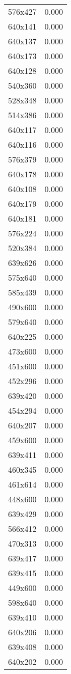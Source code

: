 \begin{table}
\begin{tabular}{lr}
576x427 & 0.000 \\
640x141 & 0.000 \\
640x137 & 0.000 \\
640x173 & 0.000 \\
640x128 & 0.000 \\
540x360 & 0.000 \\
528x348 & 0.000 \\
514x386 & 0.000 \\
640x117 & 0.000 \\
640x116 & 0.000 \\
576x379 & 0.000 \\
640x178 & 0.000 \\
640x108 & 0.000 \\
640x179 & 0.000 \\
640x181 & 0.000 \\
576x224 & 0.000 \\
520x384 & 0.000 \\
639x626 & 0.000 \\
575x640 & 0.000 \\
585x439 & 0.000 \\
490x600 & 0.000 \\
579x640 & 0.000 \\
640x225 & 0.000 \\
473x600 & 0.000 \\
451x600 & 0.000 \\
452x296 & 0.000 \\
639x420 & 0.000 \\
454x294 & 0.000 \\
640x207 & 0.000 \\
459x600 & 0.000 \\
639x411 & 0.000 \\
460x345 & 0.000 \\
461x614 & 0.000 \\
448x600 & 0.000 \\
639x429 & 0.000 \\
566x412 & 0.000 \\
470x313 & 0.000 \\
639x417 & 0.000 \\
639x415 & 0.000 \\
449x600 & 0.000 \\
598x640 & 0.000 \\
639x410 & 0.000 \\
640x206 & 0.000 \\
639x408 & 0.000 \\
640x202 & 0.000 \\

\end{tabular}
\end{table}
